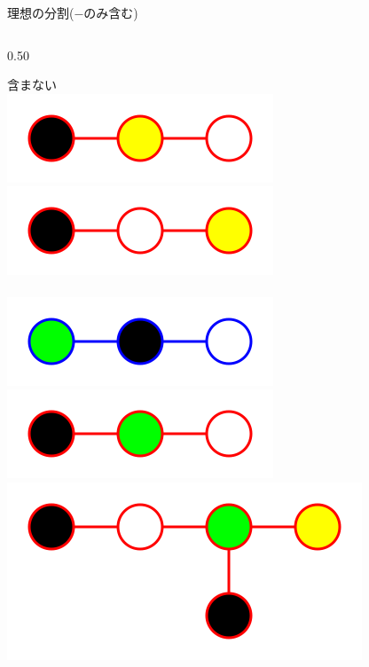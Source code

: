 \begin{tcolorbox}[title={\Large Gradient~Boosting~Decition~Tree}]
	\vspace{50px}

	理想の分割($\minus$のみ含む) \\
	\vspace{-60px}
	\begin{columns}[t]
		\begin{column}{0.50\hsize}
		\begin{tcolorbox}[colback=white]
			含まない \\
			\includegraphics[height=0.7\baselineskip]{img/graph/g02r.png} \hspace{30px}
			\includegraphics[height=0.7\baselineskip]{img/graph/g03r.png} \\
			\vspace{10px} \\
			\includegraphics[height=0.7\baselineskip]{img/graph/g04b.png} \hspace{30px}
			\includegraphics[height=0.7\baselineskip]{img/graph/g01r.png} \hspace{30px}
			\includegraphics[height=1.4\baselineskip]{img/graph/g07r.png} \\

\end{tcolorbox}
\end{column}
\end{columns}
\end{tcolorbox}
